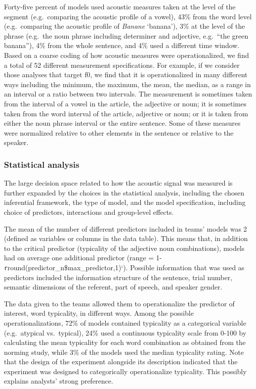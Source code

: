 \documentclass[Review,times,sageh]{sagej}
\begin{document}
Forty-five percent of models used acoustic measures taken at the level of the segment (e.g.~comparing the acoustic profile of a vowel), 43\% from the word level (e.g.~comparing the acoustic profile of \emph{Banane} `banana'), 3\% at the level of the phrase (e.g.~the noun phrase including determiner and adjective, e.g.~``the green banana''), 4\% from the whole sentence, and 4\% used a different time window.
Based on a coarse coding of how acoustic measures were operationalized, we find a total of 52 different measurement specifications.
For example, if we consider those analyses that target f0, we find that it is operationalized in many different ways including the minimum, the maximum, the mean, the median, as a range in an interval or a ratio between two intervals.
The measurement is sometimes taken from the interval of a vowel in the article, the adjective or noun; it is sometimes taken from the word interval of the article, adjective or noun; or it is taken from either the noun phrase interval or the entire sentence.
Some of these measures were normalized relative to other elements in the sentence or relative to the speaker.

\hypertarget{statistical-analysis}{%
\subsubsection{Statistical analysis}\label{statistical-analysis}}

The large decision space related to how the acoustic signal was measured is further expanded by the choices in the statistical analysis, including the chosen inferential framework, the type of model, and the model specification, including choice of predictors, interactions and group-level effects.

The mean of the number of different predictors included in teams' models was 2 (defined as variables or columns in the data table).
This means that, in addition to the critical predictor (typicality of the adjective noun combinations), models had on average one additional predictor (range = 1-\texttt{r}round(predictor\_n\$max\_predictor,1)`).
Possible information that was used as predictors included the information structure of the sentence, trial number, semantic dimensions of the referent, part of speech, and speaker gender.

The data given to the teams allowed them to operationalize the predictor of interest, word typicality, in different ways.
Among the possible operationalizations, 72\% of models contained typicality as a categorical variable (e.g.~atypical vs.~typical), 24\% used a continuous typicality scale from 0-100 by calculating the mean typicality for each word combination as obtained from the norming study, while 3\% of the models used the median typicality rating.
Note that the design of the experiment alongside its description indicated that the experiment was designed to categorically operationalize typicality. This possibly explains analysts' strong preference.
\end{document}
